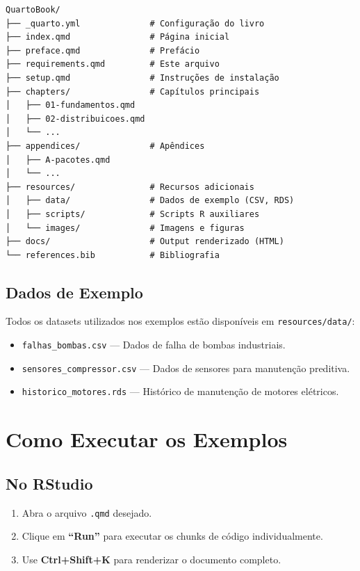 \documentclass[
  letterpaper,
]{book}
\providecommand{\tightlist}{%
  \setlength{\itemsep}{0pt}\setlength{\parskip}{0pt}}\usepackage{longtable,booktabs,array}
\begin{document}
\begin{verbatim}
QuartoBook/
├── _quarto.yml              # Configuração do livro
├── index.qmd                # Página inicial
├── preface.qmd              # Prefácio
├── requirements.qmd         # Este arquivo
├── setup.qmd                # Instruções de instalação
├── chapters/                # Capítulos principais
│   ├── 01-fundamentos.qmd
│   ├── 02-distribuicoes.qmd
│   └── ...
├── appendices/              # Apêndices
│   ├── A-pacotes.qmd
│   └── ...
├── resources/               # Recursos adicionais
│   ├── data/                # Dados de exemplo (CSV, RDS)
│   ├── scripts/             # Scripts R auxiliares
│   └── images/              # Imagens e figuras
├── docs/                    # Output renderizado (HTML)
└── references.bib           # Bibliografia
\end{verbatim}

\subsection*{Dados de Exemplo}\label{dados-de-exemplo}

Todos os datasets utilizados nos exemplos estão disponíveis em
\texttt{resources/data/}:

\begin{itemize}
\tightlist
\item
  \texttt{falhas\_bombas.csv} --- Dados de falha de bombas industriais.
\item
  \texttt{sensores\_compressor.csv} --- Dados de sensores para
  manutenção preditiva.
\item
  \texttt{historico\_motores.rds} --- Histórico de manutenção de motores
  elétricos.
\end{itemize}

\section*{Como Executar os Exemplos}\label{como-executar-os-exemplos}


\subsection*{No RStudio}\label{no-rstudio}

\begin{enumerate}
\def\labelenumi{\arabic{enumi}.}
\tightlist
\item
  Abra o arquivo \texttt{.qmd} desejado.
\item
  Clique em \textbf{``Run''} para executar os chunks de código
  individualmente.
\item
  Use \textbf{Ctrl+Shift+K} para renderizar o documento completo.
\end{enumerate}
\end{document}
